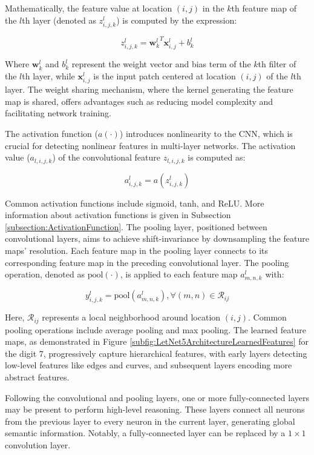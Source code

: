 Mathematically, the feature value at location $(i, j)$ in the $k$th feature map of the $l$th layer (denoted as $z^l_{i,j,k}$) is computed by the expression:

\begin{equation}
	z^l_{i,j,k} = {\mathbf{w}^l_k}^T \mathbf{x}^l_{i,j} + b^l_k
\end{equation}

Where $\mathbf{w}^l_k$ and $ b^l_k$ represent the weight vector and bias term of the $k$th filter of the $l$th layer, while $\mathbf{x}^l_{i,j}$ is the input patch centered at location $(i, j)$ of the $l$th layer. The weight sharing mechanism, where the kernel generating the feature map is shared, offers advantages such as reducing model complexity and facilitating network training.

The activation function ($a(\cdot)$) introduces nonlinearity to the CNN, which is crucial for detecting nonlinear features in multi-layer networks. The activation value ($a_{l,i,j,k}$) of the convolutional feature $z_{l,i,j,k}$ is computed as:

\begin{equation}
	a^l_{i,j,k} = a(z^l_{i,j,k})
\end{equation}

Common activation functions include sigmoid, tanh, and ReLU. More information about activation functions is given in Subsection \ref{subsection:ActivationFunction}. The pooling layer, positioned between convolutional layers, aims to achieve shift-invariance by downsampling the feature maps' resolution. Each feature map in the pooling layer connects to its corresponding feature map in the preceding convolutional layer. The pooling operation, denoted as $\mathrm{pool}(\cdot)$, is applied to each feature map $a^l_{m,n,k}$ with:

\begin{equation}
	y^l_{i,j,k} = \mathrm{pool}(a^l_{m,n,k}), \forall (m, n) \in \mathcal{R}_{ij}
\end{equation}

Here, $\mathcal{R}_{ij}$ represents a local neighborhood around location $(i, j)$. Common pooling operations include average pooling and max pooling. The learned feature maps, as demonstrated in Figure \ref{subfig:LetNet5ArchitectureLearnedFeatures} for the digit 7, progressively capture hierarchical features, with early layers detecting low-level features like edges and curves, and subsequent layers encoding more abstract features.

Following the convolutional and pooling layers, one or more fully-connected layers may be present to perform high-level reasoning. These layers connect all neurons from the previous layer to every neuron in the current layer, generating global semantic information. Notably, a fully-connected layer can be replaced by a $1 \times 1$ convolution layer.

